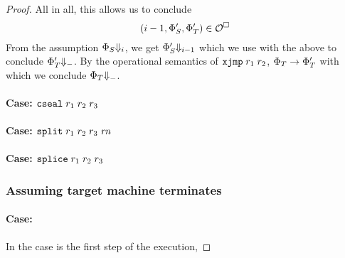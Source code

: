 \documentclass[a4paper]{article}
\begin{document}
\begin{proof}
All in all, this allows us to conclude
\[
  \npair[i-1]{\Phi_S',\Phi_T'} \in \lro
\]
From the assumption $\Phi_S\term[i]$, we get $\Phi'_S\term[i-1]$ which we use with the above to conclude $\Phi_T' \term$. By the operational semantics of $\txjmp{r_1}{r_2}$, $\Phi_T \step \Phi_T'$ with which we conclude $\Phi_T \term$.


\paragraph{Case: $\protect\tcseal{\trg{r_1}}{\trg{r_2}}{\trg{r_3}}$}

\paragraph{Case: $\protect\tsplit{\trg{r_1}}{\trg{r_2}}{\trg{r_3}}{\trg{\rn}}$}

\paragraph{Case: $\protect\tsplice{\trg{r_1}}{\trg{r_2}}{\trg{r_3}}$}

\subsubsection*{Assuming target machine terminates}
\paragraph{Case: }
In the case  is the first step of the execution,


\end{proof}
\end{document}
